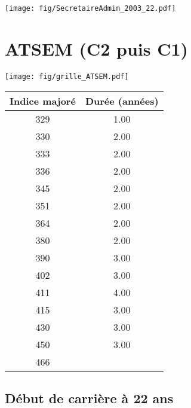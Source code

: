  \vspace{0.1cm} 

 \begin{center}\texttt{[image: fig/SecretaireAdmin\_2003\_22.pdf]}\end{center} \label{fig/SecretaireAdmin_2003_22.pdf} 

\newpage 
 
\chapter{ATSEM (C2 puis C1)} 

\begin{minipage}{0.55\linewidth}\texttt{[image: fig/grille\_ATSEM.pdf]}\end{minipage} 
\begin{minipage}{0.3\linewidth} 
 \begin{center} 

\begin{tabular}[htb]{|c|c|} 
\hline 
 Indice majoré &  Durée (années) \\ 
\hline \hline 
 329 &  1.00 \\ 
\hline 
 330 &  2.00 \\ 
\hline 
 333 &  2.00 \\ 
\hline 
 336 &  2.00 \\ 
\hline 
 345 &  2.00 \\ 
\hline 
 351 &  2.00 \\ 
\hline 
 364 &  2.00 \\ 
\hline 
 380 &  2.00 \\ 
\hline 
 390 &  3.00 \\ 
\hline 
 402 &  3.00 \\ 
\hline 
 411 &  4.00 \\ 
\hline 
 415 &  3.00 \\ 
\hline 
 430 &  3.00 \\ 
\hline 
 450 &  3.00 \\ 
\hline 
 466 &   \\ 
\hline 
\hline 
\end{tabular} 
\end{center} 
 \end{minipage} 


 \addto{\captionsenglish}{ \renewcommand{\mtctitle}{}} \setcounter{minitocdepth}{2} 
 \minitoc \newpage 

\section{Début de carrière à 22 ans} 

